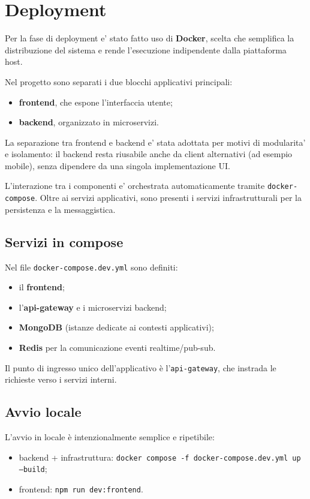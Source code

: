 \section{Deployment}

Per la fase di deployment e' stato fatto uso di \textbf{Docker}, scelta che semplifica la distribuzione del sistema e rende l'esecuzione indipendente dalla piattaforma host.

Nel progetto sono separati i due blocchi applicativi principali:

\begin{itemize}
	\item \textbf{frontend}, che espone l'interfaccia utente;
	\item \textbf{backend}, organizzato in microservizi.
\end{itemize}

La separazione tra frontend e backend e' stata adottata per motivi di modularita' e isolamento: il backend resta riusabile anche da client alternativi (ad esempio mobile), senza dipendere da una singola implementazione UI.

L'interazione tra i componenti e' orchestrata automaticamente tramite \texttt{docker-compose}. Oltre ai servizi applicativi, sono presenti i servizi infrastrutturali per la persistenza e la messaggistica.

\subsection{Servizi in compose}

Nel file \texttt{docker-compose.dev.yml} sono definiti:

\begin{itemize}
	\item il \textbf{frontend};
	\item l'\textbf{api-gateway} e i microservizi backend;
	\item \textbf{MongoDB} (istanze dedicate ai contesti applicativi);
	\item \textbf{Redis} per la comunicazione eventi realtime/pub-sub.
\end{itemize}

Il punto di ingresso unico dell'applicativo è l'\texttt{api-gateway}, che instrada le richieste verso i servizi interni.

\subsection{Avvio locale}

L'avvio in locale è intenzionalmente semplice e ripetibile:

\begin{itemize}
	\item backend + infrastruttura: \texttt{docker compose -f docker-compose.dev.yml up --build};
	\item frontend: \texttt{npm run dev:frontend}.
\end{itemize}

\newpage